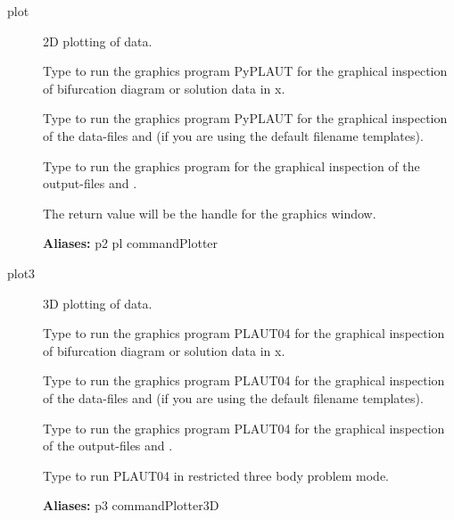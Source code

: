 \documentclass[12pt]{report}
\begin{document}
\begin{description}
\item[plot]
2D plotting of data.

    Type  to run the graphics program PyPLAUT for the graphical
    inspection of bifurcation diagram or solution data in x.

    Type  to run the graphics program PyPLAUT for the graphical
    inspection of the data-files  and  (if you are using the
    default filename templates).

    Type  to run the graphics program for the graphical
    inspection of the output-files  and .

    The return value will be the handle for the graphics window.
    
\textbf{Aliases:} p2 pl commandPlotter

\item[plot3]
3D plotting of data.

    Type  to run the graphics program PLAUT04 for the graphical
    inspection of bifurcation diagram or solution data in x.

    Type  to run the graphics program PLAUT04 for the graphical
    inspection of the data-files  and  (if you are using the
    default filename templates).

    Type  to run the graphics program PLAUT04 for the graphical
    inspection of the output-files  and .

    Type  to run PLAUT04 in restricted three body
    problem mode.
    
\textbf{Aliases:} p3 commandPlotter3D
\end{description}
\end{document}
